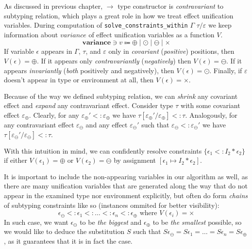 \documentclass[declaration,shortabstract]{iithesis}
\theoremstyle{definition} \newtheorem{definition}{Definition}[section]
\begin{document}
As discussed in previous chapter, $\rightarrow$ type constructor is \textit{contravariant} to subtyping relation, which plays a great role in how we treat effect unification variables.
During computation of \texttt{solve\_constraints\_within} $\Gamma$ $\tau/\varepsilon$ we keep information about $variance$ of effect unification variables as a function $V$.
$$\textbf{variance} \ni v \Coloneqq \oplus \mid \odot \mid \ominus \mid \times$$
If variable $\epsilon$ appears in $\Gamma$, $\tau$, and $\varepsilon$ only in \textit{covariant} (\textit{positive}) positions, then $V(\epsilon) = \oplus$.
If it appears only \textit{contravariantly} (\textit{negatively}) then $V(\epsilon) = \ominus$. If it appears \textit{invariantly} (\textit{both} positively and negatively), then $V(\epsilon) = \odot$. Finally, if $\varepsilon$ doesn't appear in type or environment at all, then $V(\epsilon) = \times$.

Because of the way we defined subtyping relation, we can \textit{shrink} any covariant effect and \textit{expand} any contravariant effect.
Consider type $\tau$ with some covariant effect $\varepsilon_\oplus$.
Clearly, for any $\varepsilon_\oplus' <: \varepsilon_\oplus$ we have
$ \tau[\varepsilon_\oplus' / \varepsilon_\oplus] <: \tau $.
Analogously, for any contravariant effect $\varepsilon_\ominus$ and 
any effect $\varepsilon_\ominus'$ such that $\varepsilon_\ominus <: \varepsilon_\ominus'$
we have
$ \tau[\varepsilon_\ominus' / \varepsilon_\ominus] <: \tau$.

With this intuition in mind, we can confidently resolve constraints
$\{\epsilon_1 <: I_2 * \epsilon_2\}$ if either $V(\epsilon_1) = \oplus$ or $V(\epsilon_2)=\ominus$
by assignment $[\epsilon_1 \mapsto I_2 * \epsilon_2]$.

It is important to include the non-appearing variables in our algorithm as well,
as there are many unification variables that are generated along the way
that do not appear in the examined type nor environment explicitly,
but often do form \textit{chains} of subtyping constraints like so
(instances ommited for better visibility):
$$\epsilon_\ominus <: \epsilon_1 <: \dots <: \epsilon_n <: \epsilon_\oplus \text{ where } V(\epsilon_i) = \times$$
In such case, we want $\epsilon_\ominus$ to be \textit{the biggest} and $\epsilon_\oplus$ to be \textit{the smallest} possible, so we would like to deduce the substitution $S$ such that
$S\epsilon_\ominus = S\epsilon_1 = \dots = S\epsilon_n = S\epsilon_\oplus$,
as it guarantees that it is in fact the case.
\end{document}
